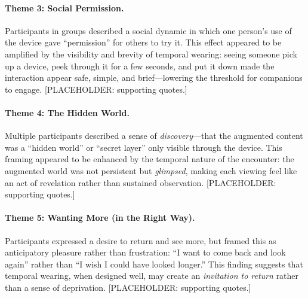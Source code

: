 \paragraph{Theme 3: Social Permission.}
Participants in groups described a social dynamic in which one person's use of the device gave ``permission'' for others to try it. This effect appeared to be amplified by the visibility and brevity of temporal wearing: seeing someone pick up a device, peek through it for a few seconds, and put it down made the interaction appear safe, simple, and brief---lowering the threshold for companions to engage. [PLACEHOLDER: supporting quotes.]

\paragraph{Theme 4: The Hidden World.}
Multiple participants described a sense of \textit{discovery}---that the augmented content was a ``hidden world'' or ``secret layer'' only visible through the device. This framing appeared to be enhanced by the temporal nature of the encounter: the augmented world was not persistent but \textit{glimpsed}, making each viewing feel like an act of revelation rather than sustained observation. [PLACEHOLDER: supporting quotes.]

\paragraph{Theme 5: Wanting More (in the Right Way).}
Participants expressed a desire to return and see more, but framed this as anticipatory pleasure rather than frustration: ``I want to come back and look again'' rather than ``I wish I could have looked longer.'' This finding suggests that temporal wearing, when designed well, may create an \textit{invitation to return} rather than a sense of deprivation. [PLACEHOLDER: supporting quotes.]
